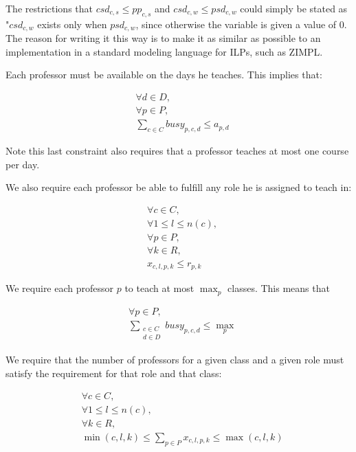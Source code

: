 The restrictions that $csd_{c, s} \le pp_{c, s}$ and $csd_{c, w} \le psd_{c, w}$ could simply be stated as "$csd_{c, w}$ exists only when $psd_{c, w}$, since otherwise the variable is given a value of $0$. The reason for writing it this way is to make it as similar as possible to an implementation in a standard modeling language for ILPs, such as ZIMPL.

Each professor must be available on the days he teaches. This implies that:

\begin{align} \label{eq:availability}
  &\forall d \in D,\\
  &\forall p \in P,\\
  &\sum_{c \in C} busy_{p, c, d} \le a_{p, d}
\end{align}

Note this last constraint also requires that a professor teaches at most one course per day.

We also require each professor be able to fulfill any role he is assigned to teach in:

\begin{align} \label{eq:rolevalidity}
  &\forall c \in C,\\
  &\forall 1 \le l \le n(c),\\
  &\forall p \in P,\\
  &\forall k \in R,\\
  &x_{c, l, p, k} \le r_{p, k}
\end{align}

We require each professor $p$ to teach at most $\max_p$ classes. This means that

\begin{align}
  &\forall p \in P,\\
  &\sum_{\substack{c \in C\\d \in D}} busy_{p, c, d} \le \textstyle{\max_p}
\end{align}

We require that the number of professors for a given class and a given role must satisfy the requirement for that role and that class:

\begin{align}\label{eq:classreqs}
  &\forall c \in C,\\
  &\forall 1 \le l \le n(c),\\
  &\forall k \in R,\\
  &\min(c, l, k) \le \sum_{p \in P} x_{c, l, p, k} \le \max(c, l, k)
\end{align}

